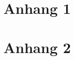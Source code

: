 
\printbibliography
\newpage
\appendix
\section{Anhang 1} \label{app:appendixA}
\section{Anhang 2} \label{app:appendixB}